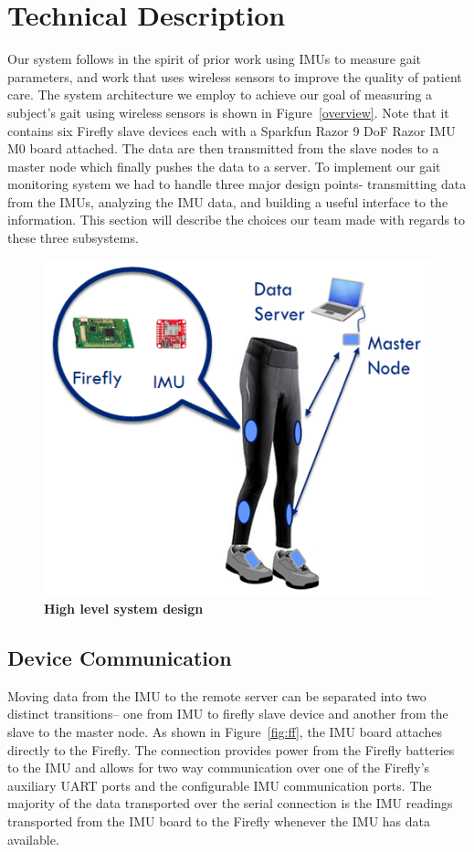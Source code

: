 \documentclass[conference]{IEEEtran}
\begin{document}
\section{Technical Description}
Our system follows in the spirit of prior work using IMUs to measure gait parameters, and
work that uses wireless sensors to improve the quality of patient care. The system
architecture we employ to achieve our goal of measuring a subject's gait using wireless
sensors is shown in Figure~\ref{overview}. Note that it contains six Firefly slave devices
each with a Sparkfun Razor 9 DoF Razor IMU M0 board attached. The data are then
transmitted from the slave nodes to a master node which finally pushes the data to a
server. To implement our gait monitoring system we had to handle three major design
points- transmitting data from the IMUs, analyzing the IMU data, and building a useful
interface to the information. This section will describe the choices our team made with
regards to these three subsystems. 

\begin{figure}[h]
  \centering
  \includegraphics[width=0.75\columnwidth]{figs/sysarch}
  \caption{{\bf High level system design}}
  \label{fig:overview}
\end{figure}



\subsection{Device Communication}
Moving data from the IMU to the remote server can be separated into two distinct
transitions-- one from IMU to firefly slave device and another from the slave to the
master node. As shown in Figure~\ref{fig:ff}, the IMU board attaches directly to the
Firefly. The connection provides power from the Firefly batteries to the IMU and allows
for two way communication over one of the Firefly's auxiliary UART ports and the
configurable IMU communication ports. The majority of the data transported over the serial
connection is the IMU readings transported from the IMU board to the Firefly whenever the
IMU has data available. 
\end{document}

